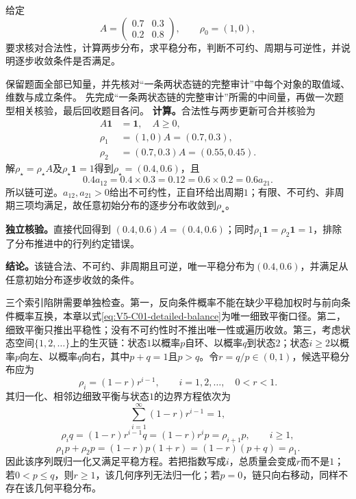 \label{struct:V5-C01-CH32}
\begin{example}[一条两状态链的完整审计]\label{exm:V5-C01-two-state-audit}
给定
\[
A=\begin{pmatrix}0.7&0.3\\0.2&0.8\end{pmatrix},\qquad \rho_0=(1,0),
\]
要求核对合法性，计算两步分布，求平稳分布，判断不可约、周期与可逆性，并说明逐步收敛条件是否满足。
\end{example}

\label{struct:V5-C01-CH33}
\begin{solution}
\SolGiven 保留题面全部已知量，并先核对“一条两状态链的完整审计”中每个对象的取值域、维数与成立条件。
\SolPlan 先完成“一条两状态链的完整审计”所需的中间量，再做一次题型相关核验，最后回收题目各问。
\SolDerive
\textbf{计算。}合法性与两步更新可合并核验为
\[
\begin{aligned}
A\boldsymbol 1&=\boldsymbol 1,\quad A\ge0,\\
\rho_1&=(1,0)A=(0.7,0.3),\\
\rho_2&=(0.7,0.3)A=(0.55,0.45).
\end{aligned}
\]
解$\rho_\star=\rho_\star A$及$\rho_\star\boldsymbol1=1$得到$\rho_\star=(0.4,0.6)$，且
\[
0.4a_{12}=0.4\times0.3=0.12
=0.6\times0.2=0.6a_{21}.
\]
所以链可逆。$a_{12},a_{21}>0$给出不可约性，正自环给出周期$1$；有限、不可约、非周期三项均满足，故任意初始分布的逐步分布收敛到$\rho_\star$。

\textbf{独立核验。}直接代回得到
$(0.4,0.6)A=(0.4,0.6)$；同时$\rho_1\boldsymbol1=\rho_2\boldsymbol1=1$，排除了分布推进中的行列约定错误。

\textbf{结论。}该链合法、不可约、非周期且可逆，唯一平稳分布为$(0.4,0.6)$，并满足从任意初始分布逐步收敛的条件。
\end{solution}

\label{struct:V5-C01-CH34}
\begin{warningbox}
三个索引陷阱需要单独检查。第一，反向条件概率不能在缺少平稳加权时与前向条件概率互换，本章以式\eqref{eq:V5-C01-detailed-balance}为唯一细致平衡口径。第二，细致平衡只推出平稳性；没有不可约性时不推出唯一性或遍历收敛。第三，考虑状态空间$\{1,2,\ldots\}$上的生灭链：状态$1$以概率$p$自环、以概率$q$到状态$2$；状态$i\ge2$以概率$p$向左、以概率$q$向右，其中$p+q=1$且$p>q$。令$r=q/p\in(0,1)$，候选平稳分布应为
\[
\rho_i=(1-r)r^{i-1},\qquad i=1,2,\ldots,\quad0<r<1.
\]
其归一化、相邻边细致平衡与状态$1$的边界方程依次为
\[
\sum_{i=1}^{\infty}(1-r)r^{i-1}=1,
\]
\[
\rho_iq=(1-r)r^{i-1}q
=(1-r)r^ip=\rho_{i+1}p,
\qquad i\ge1,
\]
\[
\rho_1p+\rho_2p=(1-r)p(1+r)
=(1-r)(p+q)=\rho_1.
\]
因此该序列既归一化又满足平稳方程。若把指数写成$i$，总质量会变成$r$而不是$1$；若$0<p\le q$，则$r\ge1$，该几何序列无法归一化；若$p=0$，链只向右移动，同样不存在该几何平稳分布。
\end{warningbox}

